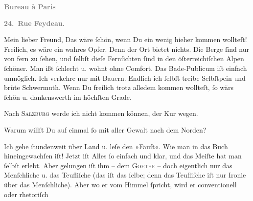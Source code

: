 \pstart
           \begin{otherlanguage}{french}\textcolor{gray}{\textbf{\textbf{Bureau à Paris}}}\end{otherlanguage}\pend
           
\pstart
           \begin{otherlanguage}{french}\textcolor{gray}{\textbf{\textbf{24. Rue Feydeau.}}}\end{otherlanguage}\pend
           
\pstart\center{}Mein lieber Freund,\pend\vspace{0.5em}
\pstart
           Das wäre ſchön, wenn Du ein wenig hieher kommen wollteſt! Freilich, es wäre ein
               wahres Opfer. Denn der Ort
               bietet nichts. Die Berge ſind nur von fern zu ſehen, und ſelbſt dieſe Fernſichten
               ſind in den öſterreichiſchen Alpen ſchöner. Man ißt ſchlecht u. wohnt ohne Comfort. Das
               Bade-Publicum iſt einfach unmöglich. Ich verkehre nur mit Bauern. {\pb}Endlich ich ſelbſt  treibe Selbſtpein und brüte Schwermuth. Wenn Du freilich trotz alledem kommen
               wollteſt, ſo wärs ſchön u. dankenswerth im höchſten Grade.\pend
           
\pstart
           Nach \textsc{Salzburg} werde ich nicht kommen können, der Kur wegen.\pend
           
\pstart
           Warum willſt Du auf einmal ſo mit aller Gewalt nach dem Norden?\pend
           
\pstart
           Ich gehe ſtundenweit über Land u. leſe den »Fauſt«. Wie man in das {\pb}Buch hineingewachſen iſt!
               Jetzt iſt Alles ſo einfach und klar, und das Meiſte hat man ſelbſt erlebt. Aber
               gelungen iſt ihm – dem \textsc{Goethe} – doch eigentlich nur das Menſchliche u. das Teufliſche (das iſt das ſelbe;
               denn das Teufliſche iſt nur Ironie über das Menſchliche). Aber wo er vom Himmel
               ſpricht, wird er conventionell oder rhetoriſch{\dotsfive}\pend
           
